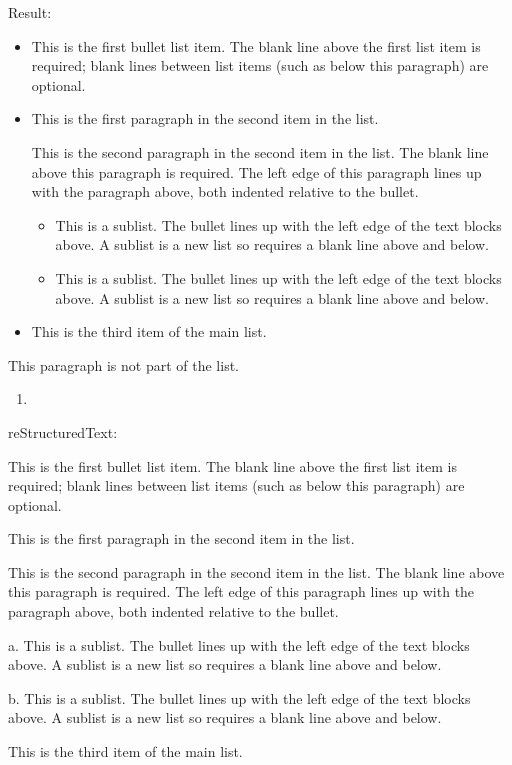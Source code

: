 \documentclass[letterpaper,11pt,english]{sphinxmanual}
\begin{document}
Result:
\begin{itemize}
\item {} 
This is the first bullet list item.  The blank line above the
first list item is required; blank lines between list items
(such as below this paragraph) are optional.

\item {} 
This is the first paragraph in the second item in the list.

This is the second paragraph in the second item in the list.
The blank line above this paragraph is required.  The left edge
of this paragraph lines up with the paragraph above, both
indented relative to the bullet.
\begin{itemize}
\item {} 
This is a sublist.  The bullet lines up with the left edge of
the text blocks above.  A sublist is a new list so requires a
blank line above and below.

\item {} 
This is a sublist.  The bullet lines up with the left edge of
the text blocks above.  A sublist is a new list so requires a
blank line above and below.

\end{itemize}

\item {} 
This is the third item of the main list.

\end{itemize}

This paragraph is not part of the list.
\begin{enumerate}
\def\theenumi{\arabic{enumi}}
\def\labelenumi{\theenumi .}
\makeatletter\def\p@enumii{\p@enumi \theenumi .}\makeatother
\setcounter{enumi}{2}
\item {} 

\end{enumerate}

reStructuredText:

\begin{sphinxVerbatim}[commandchars=\\\{\}]
 This is the first bullet list item.  The blank line above the
   first list item is required; blank lines between list items
   (such as below this paragraph) are optional.

 This is the first paragraph in the second item in the list.

   This is the second paragraph in the second item in the list.
   The blank line above this paragraph is required.  The left edge
   of this paragraph lines up with the paragraph above, both
   indented relative to the bullet.

   a. This is a sublist.  The bullet lines up with the left edge of
      the text blocks above.  A sublist is a new list so requires a
      blank line above and below.

   b. This is a sublist.  The bullet lines up with the left edge of
      the text blocks above.  A sublist is a new list so requires a
      blank line above and below.


 This is the third item of the main list.
\end{sphinxVerbatim}
\end{document}
